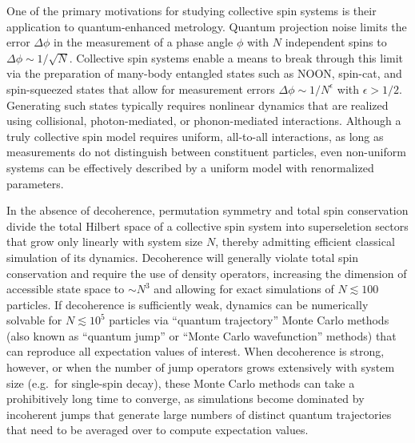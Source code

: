 \documentclass[pra,reprint,longbibliography]{revtex4-1}
\newcommand{\1}{\mathds{1}}
\begin{document}
One of the primary motivations for studying collective spin systems is
their application to quantum-enhanced metrology.  Quantum projection
noise limits the error $\Delta\phi$ in the measurement of a phase
angle $\phi$ with $N$ independent spins to
$\Delta\phi\sim1/\sqrt{N}$\cite{wineland1992spin, itano1993quantum,
  ma2011quantum}.  Collective spin systems enable a means to break
through this limit via the preparation of many-body entangled states
such as NOON\cite{jones2009magnetic, chen2010heralded,
  zhong2010simplified}, spin-cat\cite{agarwal1997atomic,
  lau2014proposal, huang2015quantum}, and spin-squeezed
states\cite{wineland1992spin, kitagawa1993squeezed, takano2009spin,
  appel2009mesoscopic, schleier-smith2010states,
  schleier-smith2010squeezing, leroux2010implementation,
  riedel2010atomchipbased, gross2010nonlinear, chen2011conditional,
  bohnet2014reduced, cox2016deterministic, hosten2016measurement,
  hosten2016quantum, lewis-swan2018robust, norcia2018cavitymediated,
  ma2011quantum, he2019engineering} that allow for measurement errors
$\Delta\phi\sim1/N^\epsilon$ with $\epsilon>1/2$.  Generating such
states typically requires nonlinear dynamics that are realized using
collisional, photon-mediated, or phonon-mediated interactions.
Although a truly collective spin model requires uniform, all-to-all
interactions, as long as measurements do not distinguish between
constituent particles, even non-uniform systems can be effectively
described by a uniform model with renormalized
parameters\cite{hu2015entangled}.

In the absence of decoherence, permutation symmetry and total spin
conservation divide the total Hilbert space of a collective spin
system into superseletion sectors that grow only linearly with system
size $N$, thereby admitting efficient classical simulation of its
dynamics.  Decoherence will generally violate total spin conservation
and require the use of density operators, increasing the dimension of
accessible state space to $\sim N^3$\cite{hartmann2016generalized,
  xu2013simulating} and allowing for exact simulations of
$N\lesssim100$ particles.  If decoherence is sufficiently weak,
dynamics can be numerically solvable for $N\lesssim10^5$ particles via
``quantum trajectory'' Monte Carlo methods\cite{plenio1998quantumjump,
  zhang2018montecarlo} (also known as ``quantum jump'' or ``Monte
Carlo wavefunction'' methods) that can reproduce all expectation
values of interest.  When decoherence is strong, however, or when the
number of jump operators grows extensively with system size (e.g.~for
single-spin decay), these Monte Carlo methods can take a prohibitively
long time to converge, as simulations become dominated by incoherent
jumps that generate large numbers of distinct quantum trajectories
that need to be averaged over to compute expectation values.
\end{document}
